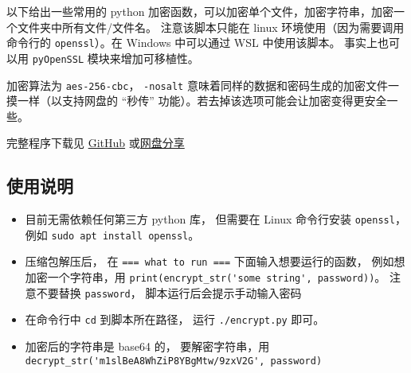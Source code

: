 

以下给出一些常用的 python 加密函数，可以加密单个文件，加密字符串，加密一个文件夹中所有文件/文件名。 注意该脚本只能在 linux 环境使用（因为需要调用命令行的 \verb`openssl`）。在 Windows 中可以通过 WSL 中使用该脚本。 事实上也可以用 \verb|pyOpenSSL| 模块来增加可移植性。

加密算法为 \verb`aes-256-cbc`， \verb`-nosalt` 意味着同样的数据和密码生成的加密文件一摸一样（以支持网盘的 “秒传” 功能）。若去掉该选项可能会让加密变得更安全一些。

完整程序下载见 \href{https://github.com/MacroUniverse/MyPythonLibrary/tree/master/encrypt}{GitHub} 或\href{https://pan.baidu.com/s/1y4Asx-oS4ShGlN9kIyRZeg?pwd=3q1d#list/path=\%252F}{网盘分享}

\subsection{使用说明}
\begin{itemize}
\item 目前无需依赖任何第三方 python 库， 但需要在 Linux 命令行安装 \verb`openssl`， 例如 \verb`sudo apt install openssl`。
\item 压缩包解压后， 在 \verb`=== what to run ===` 下面输入想要运行的函数， 例如想加密一个字符串，用 \verb`print(encrypt_str('some string', password))`。 注意不要替换 \verb`password`， 脚本运行后会提示手动输入密码
\item 在命令行中 \verb`cd` 到脚本所在路径， 运行 \verb`./encrypt.py` 即可。
\item 加密后的字符串是 base64 的， 要解密字符串，用 \verb`decrypt_str('m1slBeA8WhZiP8YBgMtw/9zxV2G', password)`
\end{itemize}

